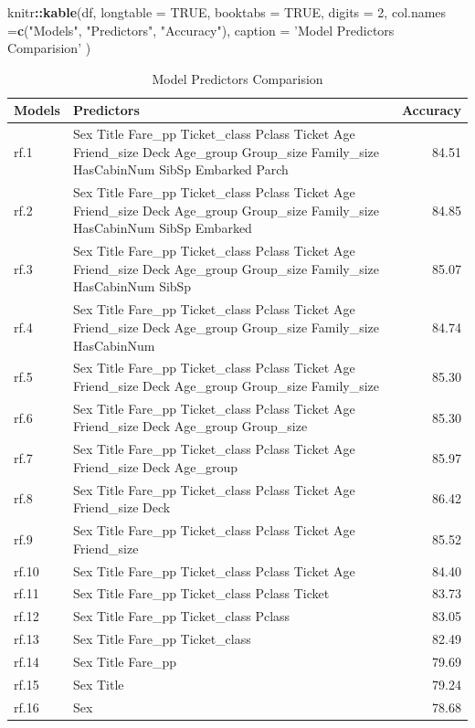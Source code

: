 \documentclass[
]{book}
\newenvironment{Shaded}{\begin{snugshade}}{\end{snugshade}}
\newcommand{\DataTypeTok}[1]{\textcolor[rgb]{0.13,0.29,0.53}{#1}}
\newcommand{\DecValTok}[1]{\textcolor[rgb]{0.00,0.00,0.81}{#1}}
\newcommand{\KeywordTok}[1]{\textcolor[rgb]{0.13,0.29,0.53}{\textbf{#1}}}
\newcommand{\NormalTok}[1]{#1}
\newcommand{\OperatorTok}[1]{\textcolor[rgb]{0.81,0.36,0.00}{\textbf{#1}}}
\newcommand{\OtherTok}[1]{\textcolor[rgb]{0.56,0.35,0.01}{#1}}
\newcommand{\StringTok}[1]{\textcolor[rgb]{0.31,0.60,0.02}{#1}}
\begin{document}
\begin{Shaded}
\begin{Highlighting}[]
\NormalTok{knitr}\OperatorTok{::}\KeywordTok{kable}\NormalTok{(df, }\DataTypeTok{longtable =} \OtherTok{TRUE}\NormalTok{, }\DataTypeTok{booktabs =} \OtherTok{TRUE}\NormalTok{, }\DataTypeTok{digits =} \DecValTok{2}\NormalTok{, }\DataTypeTok{col.names =}\KeywordTok{c}\NormalTok{(}\StringTok{"Models"}\NormalTok{, }\StringTok{"Predictors"}\NormalTok{, }\StringTok{"Accuracy"}\NormalTok{), }
  \DataTypeTok{caption =} \StringTok{'Model Predictors Comparision'}
\NormalTok{)}
\end{Highlighting}
\end{Shaded}

\begin{longtable}[t]{llr}
\caption{\label{tab:Comppredictor}Model Predictors Comparision}\\
\toprule
Models & Predictors & Accuracy\\
\midrule
rf.1 & Sex Title Fare\_pp Ticket\_class Pclass Ticket Age Friend\_size Deck Age\_group Group\_size Family\_size HasCabinNum SibSp Embarked Parch & 84.51\\
rf.2 & Sex Title Fare\_pp Ticket\_class Pclass Ticket Age Friend\_size Deck Age\_group Group\_size Family\_size HasCabinNum SibSp Embarked & 84.85\\
rf.3 & Sex Title Fare\_pp Ticket\_class Pclass Ticket Age Friend\_size Deck Age\_group Group\_size Family\_size HasCabinNum SibSp & 85.07\\
rf.4 & Sex Title Fare\_pp Ticket\_class Pclass Ticket Age Friend\_size Deck Age\_group Group\_size Family\_size HasCabinNum & 84.74\\
rf.5 & Sex Title Fare\_pp Ticket\_class Pclass Ticket Age Friend\_size Deck Age\_group Group\_size Family\_size & 85.30\\
\addlinespace
rf.6 & Sex Title Fare\_pp Ticket\_class Pclass Ticket Age Friend\_size Deck Age\_group Group\_size & 85.30\\
rf.7 & Sex Title Fare\_pp Ticket\_class Pclass Ticket Age Friend\_size Deck Age\_group & 85.97\\
rf.8 & Sex Title Fare\_pp Ticket\_class Pclass Ticket Age Friend\_size Deck & 86.42\\
rf.9 & Sex Title Fare\_pp Ticket\_class Pclass Ticket Age Friend\_size & 85.52\\
rf.10 & Sex Title Fare\_pp Ticket\_class Pclass Ticket Age & 84.40\\
\addlinespace
rf.11 & Sex Title Fare\_pp Ticket\_class Pclass Ticket & 83.73\\
rf.12 & Sex Title Fare\_pp Ticket\_class Pclass & 83.05\\
rf.13 & Sex Title Fare\_pp Ticket\_class & 82.49\\
rf.14 & Sex Title Fare\_pp & 79.69\\
rf.15 & Sex Title & 79.24\\
\addlinespace
rf.16 & Sex & 78.68\\
\bottomrule
\end{longtable}
\end{document}
